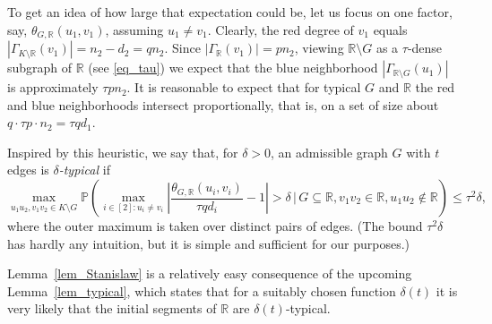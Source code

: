 \documentclass[12pt,reqno]{amsart}
\newcommand{\Prob} {\mathbb {P}}
\newcommand{\prob}[1]{\Prob\left(#1\right)}
\newcommand{\Pc}[2]{\prob{#1\,|\,#2}}
\newcommand{\R} {\mathbb R}
\theoremstyle{definition}
\begin{document}
To get an idea of how large that expectation could be, let us focus on one factor, say, $\theta_{G,\R}(u_1,v_1)$, assuming $u_1 \neq v_1$.
Clearly, the red degree of $v_1$ equals
$|\Gamma_{K\setminus\R}(v_1)| = n_2 - d_2 = qn_2$. Since $|\Gamma_{\R}(v_1)| = pn_2$, viewing $\R \setminus G$ as a $\tau$-dense subgraph of $\R$ (see \eqref{eq_tau}) we expect that the blue neighborhood $|\Gamma_{\R\setminus G}(u_1)|$ is approximately $\tau p n_2$.
It is reasonable to expect that for typical $G$ and $\R$ the red and blue neighborhoods intersect proportionally, that is, on a set of size about $q \cdot \tau p \cdot n_2 = \tau qd_1$.



 Inspired by this heuristic, we say that, for  $\delta > 0$, an admissible graph $G$ with $t$ edges is \emph{$\delta$-typical}  if
\begin{equation}
  \label{eq_typical}
  \max_{u_1u_2, v_1v_2 \in K \setminus G}	\Pc{\max_{i \in [2] : u_i \neq v_i}\left|\frac{\theta_{G,\R}(u_i,v_i)}{\tau qd_i } - 1\right| > \delta }{G \subseteq \R, v_1v_2 \in \R, u_1u_2 \notin \R} \le \tau^2 \delta,
\end{equation}
where the outer maximum is taken over distinct pairs of edges.
(The bound $\tau^2 \delta$ has hardly any intuition, but it is simple and sufficient for our purposes.)


Lemma~\ref{lem_Stanislaw} is a relatively easy consequence of the upcoming Lemma~\ref{lem_typical}, which states that for a suitably chosen function $\delta(t)$ it is very likely that the initial segments of $\R$ are $\delta(t)$-typical.
\end{document}
